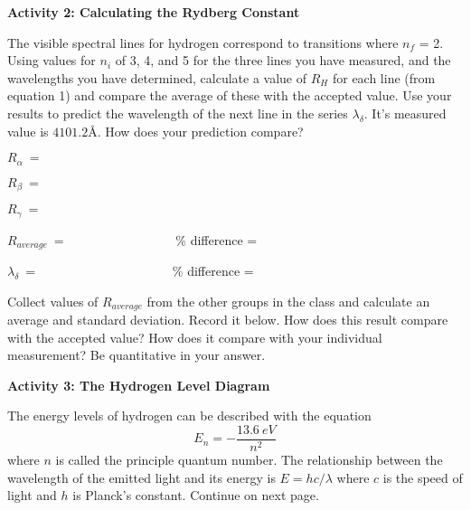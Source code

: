 \vspace{0.5in}

\textbf{Activity 2: Calculating the Rydberg Constant}

\bigskip
 
The visible spectral lines for hydrogen correspond to transitions where 
$n_f$ = 2. Using values for $n_i$ of 3, 4, and 5 for the three lines you have 
measured, and the wavelengths you have determined, calculate a value of 
$R_H$ for each line (from equation 1) and compare the average of these with 
the accepted value. Use your results to predict the wavelength of the next 
line in the series $\lambda_\delta$. It's measured value is $4101.2${\AA}.  
How does your prediction compare?     

\noindent $R_\alpha ~ = ~\qquad\qquad\qquad\qquad\qquad$

\vspace{0.4in}

\noindent $R_\beta ~ = ~\qquad\qquad\qquad\qquad\qquad$

\vspace{0.4in}

\noindent $R_\gamma ~ =~ \qquad\qquad\qquad\qquad\qquad$

\vspace{0.4in}

\noindent $R_{average} ~ =~ \qquad\qquad\qquad\qquad$  \% difference = 

\vspace{0.4in}

\noindent $\lambda_\delta ~ = ~\qquad\qquad\qquad\qquad\qquad$  \% difference =

\vspace{0.2in}


Collect values of $R_{average}$ from the other groups in the class and calculate
 an average and standard deviation. Record it below.
How does this result compare with the accepted value?
How does it compare with your individual measurement?
Be quantitative in your answer.

\vspace{2.0in}

\textbf{Activity 3: The Hydrogen Level Diagram}

\bigskip
 
The energy levels of hydrogen can be described with the equation
\begin{equation}
E_n = -\frac{13.6~eV}{n^2}
\end{equation}
where $n$ is called the principle quantum number.
The relationship between the wavelength of the emitted light and its energy
is $E=hc/\lambda$ where $c$ is the speed of light and $h$ is Planck's constant.
 Continue on next page.

